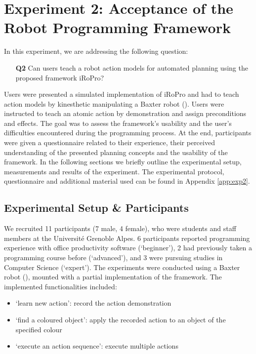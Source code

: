 \section{Experiment 2: Acceptance of the Robot Programming Framework}
\label{sec:Exp2}

In this experiment, we are addressing the following question:

\begin{enumerate}
  \item[\textbf{Q2}] Can users teach a robot action models for automated planning using the proposed framework iRoPro?
\end{enumerate}
\begin{sloppypar}
Users were presented a simulated implementation of iRoPro and had to teach action models by kinesthetic manipulating a Baxter robot (). 
Users were instructed to teach an atomic action by demonstration and assign preconditions and effects.
The goal was to assess the framework's usability and the user's difficulties encountered during the programming process.
At the end, participants were given a questionnaire related to their experience, their perceived understanding of the presented planning concepts and the usability of the framework.
In the following sections we briefly outline the experimental setup, measurements and results of the experiment.
The experimental protocol, questionnaire and additional material used can be found in Appendix \ref{app:exp2}.
\end{sloppypar}

\subsection{Experimental Setup \& Participants}
We recruited 11 participants (7 male, 4 female), who were students and staff members at the Universit\'{e} Grenoble Alpes. 
6 participants reported programming experience with office productivity software (`beginner'), 2 had previously taken a programming course before (`advanced'), and 3 were pursuing studies in Computer Science (`expert').
The experiments were conducted using a Baxter robot (), mounted with a partial implementation of the framework.
The implemented functionalities included:
\begin{itemize}
	\item `learn new action': record the action demonstration
	\item `find a coloured object': apply the recorded action to an object of the specified colour
	\item `execute an action sequence': execute multiple actions
\end{itemize}

